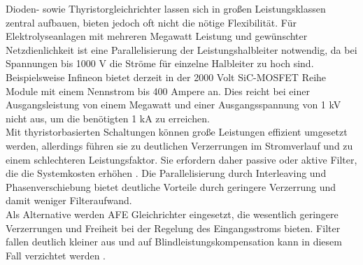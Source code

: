 		Dioden- sowie Thyristorgleichrichter lassen sich in großen Leistungsklassen zentral aufbauen, bieten jedoch oft nicht die nötige Flexibilität. Für Elektrolyseanlagen mit mehreren Megawatt Leistung und gewünschter Netzdienlichkeit ist eine Parallelisierung der Leistungshalbleiter notwendig, da bei Spannungen bis 1000 V die Ströme für einzelne Halbleiter zu hoch sind. Beispielsweise Infineon bietet derzeit in der 2000 Volt \gls{SiC}-\gls{MOSFET} Reihe Module mit einem Nennstrom bis 400 Ampere an. Dies reicht bei einer Ausgangsleistung von einem Megawatt und einer Ausgangsspannung von 1 kV nicht aus, um die benötigten 1 kA zu erreichen. \\
		Mit thyristorbasierten Schaltungen können große Leistungen effizient umgesetzt werden, allerdings führen sie zu deutlichen Verzerrungen im Stromverlauf und zu einem schlechteren Leistungsfaktor. Sie erfordern daher passive oder aktive Filter, die die Systemkosten erhöhen \cite{HydrogenElectronicTopologies}. Die Parallelisierung durch Interleaving und Phasenverschiebung bietet deutliche Vorteile durch geringere Verzerrung und damit weniger Filteraufwand. \\
		Als Alternative werden \gls{AFE} Gleichrichter eingesetzt, die wesentlich geringere Verzerrungen und Freiheit bei der Regelung des Eingangsstroms bieten. Filter fallen deutlich kleiner aus und auf Blindleistungskompensation kann in diesem Fall verzichtet werden \cite{HydrogenElectronicTopologies}.
